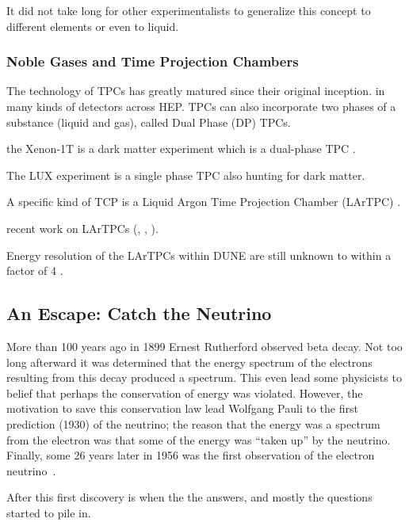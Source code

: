 It did not take long for other experimentalists to generalize this concept to different elements or even to liquid.


\subsubsection{Noble Gases and Time Projection Chambers}

The technology of TPCs has greatly matured since their original inception.
in many kinds of detectors across HEP. TPCs can also incorporate two phases of a substance (liquid and gas), called Dual Phase (DP) TPCs.

the Xenon-1T is a dark matter experiment which is a dual-phase TPC \citep{Aprile_2017_xenon1T}.

The LUX experiment is a single phase TPC also hunting for dark matter.


A specific kind of TCP is a Liquid Argon Time Projection Chamber (LArTPC) \citep{rubbia1977liquid}.

recent work on LArTPCs (\citep{ArgoNeuT:PhysRevD.99.012002}, \citep{MicroBooNE:Acciarri_2017}, \citep{LArIAT:Acciarri_2020}).


Energy resolution of the LArTPCs within DUNE are still unknown to within a factor of 4 \citep{lartpc_energy_resolution:PhysRevD.99.036009}.



\subsection{An Escape: Catch the Neutrino}

More than 100 years ago in 1899 Ernest Rutherford observed beta decay.
Not too long afterward it was determined that the energy spectrum of the electrons resulting from this decay produced a spectrum.
This even lead some physicists to belief that perhaps the conservation of energy was violated.
However, the motivation to save this conservation law lead Wolfgang Pauli to the first prediction (1930) of the neutrino; the reason that the energy was a spectrum from the electron was that some of the energy was ``taken up'' by the neutrino.
Finally, some 26 years later in 1956 was the first observation of the electron neutrino~\citep{first_neutrino_measurement}.


After this first discovery is when the the answers, and mostly the questions started to pile in.



